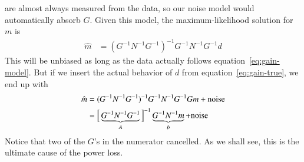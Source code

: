 \documentclass{aa}
\begin{document}
are almost always measured from the data, so our noise model would automatically absorb $G$.
Given this model, the maximum-likelihood solution for $m$ is
\begin{align}
	\hat m &= (G^{-1}N^{-1}G^{-1})^{-1}G^{-1}N^{-1}G^{-1}d \label{eq:gain-ml}
\end{align}
This will be unbiased as long as the data actually follows equation~\ref{eq:gain-model}.
But if we insert the actual behavior of $d$ from equation~\ref{eq:gain-true}, we end up with
\begin{align}
\hat m &= (G^{-1}N^{-1}G^{-1})^{-1}G^{-1}N^{-1}G^{-1}Gm + \text{noise}\notag \\
	&= \Big[\underbrace{G^{-1}N^{-1}G^{-1}}_A\Big]^{-1}\underbrace{G^{-1}N^{-1} m}_b + \text{noise} \label{eq:gaincancel}
\end{align}
Notice that two of the $G$'s in the numerator cancelled. As we shall see, this is
the ultimate cause of the power loss.
\end{document}
